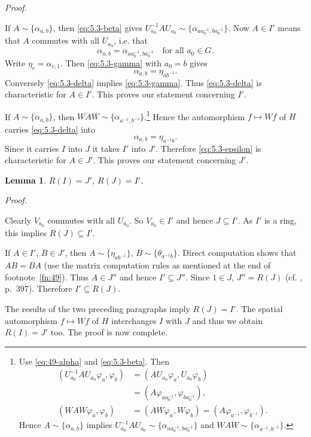 \documentclass[b5paper,twoside]{article}
\theoremstyle{mvnplain}
\newtheorem{lemma}{Lemma}[section]
\renewenvironment{proof}[1][Proof]{%
  \par\addvspace{0.35\baselineskip}%
  \noindent\textit{#1.}\ \normalfont\ignorespaces
}{%
  \par\addvspace{0.35\baselineskip}%
}
\newcommand{\R}{\mathbf R}
\newcommand{\Hilbert}{\mathfrak H}
\def\R{R}%
\def\Hilbert{H}%
\def\mathfrak#1{#1}%
\begin{document}
\begin{proof}
If \(A\sim\{\alpha_{a,b}\}\), then \eqref{eq:5.3-beta} gives
\(U_{a_0}^{-1}AU_{a_0}\sim
\{\alpha_{aa_0^{-1},ba_0^{-1}}\}\). Now \(A\in I'\) means that \(A\)
commutes with all \(U_{a_0}\), i.e. that
\begin{equation}\tag{5.3.\(\gamma\)}\label{eq:5.3-gamma}
 \alpha_{a,b}=\alpha_{aa_0^{-1},ba_0^{-1}}
 \quad\text{for all }a_0\in\mathfrak G.
\end{equation}
Write \(\eta_c=\alpha_{c,1}\). Then \eqref{eq:5.3-gamma} with \(a_0=b\)
gives
\begin{equation}\tag{5.3.\(\delta\)}\label{eq:5.3-delta}
 \alpha_{a,b}=\eta_{ab^{-1}}.
\end{equation}
Conversely \eqref{eq:5.3-delta} implies \eqref{eq:5.3-gamma}. Thus
\eqref{eq:5.3-delta} is characteristic for \(A\in I'\). This proves our
statement concerning \(I'\).

If \(A\sim\{\alpha_{a,b}\}\), then
\(WAW\sim\{\alpha_{a^{-1},b^{-1}}\}\).\footnote{\label{fn:50}Use
\eqref{eq:49-alpha} and \eqref{eq:5.3-beta}. Then
\begin{align*}
 (U_{a_0}^{-1}AU_{a_0}\varphi_a,\varphi_b)
 &=(AU_{a_0}\varphi_a,U_{a_0}\varphi_b)\\
 &=(A\varphi_{aa_0^{-1}},\varphi_{ba_0^{-1}}),\\
 (WAW\varphi_a,\varphi_b)
 &=(AW\varphi_a,W\varphi_b)
  =(A\varphi_{a^{-1}},\varphi_{b^{-1}}).
\end{align*}
Hence \(A\sim\{\alpha_{a,b}\}\) implies
\(U_{a_0}^{-1}AU_{a_0}\sim
\{\alpha_{aa_0^{-1},ba_0^{-1}}\}\) and
\(WAW\sim\{\alpha_{a^{-1},b^{-1}}\}\).} Hence the automorphism
\(f\mapsto Wf\) of \(\Hilbert\) carries \eqref{eq:5.3-delta} into
\begin{equation}\tag{5.3.\(\epsilon\)}\label{eq:5.3-epsilon}
 \alpha_{a,b}=\eta_{a^{-1}b}.
\end{equation}
Since it carries \(I\) into \(J\) it takes \(I'\) into \(J'\). Therefore
\eqref{eq:5.3-epsilon} is characteristic for \(A\in J'\). This proves our
statement concerning \(J'\).
\end{proof}

\begin{lemma}\label{lem:5.3.3}
\(\R(I)=J'\), \(\R(J)=I'\).
\end{lemma}

\begin{proof}
Clearly \(V_{a_0}\) commutes with all \(U_{a_0}\). So \(V_{a_0}\in I'\)
and hence \(J\subseteq I'\). As \(I'\) is a ring, this implies
\(\R(J)\subseteq I'\).

If \(A\in I'\), \(B\in J'\), then
\(A\sim\{\eta_{ab^{-1}}\}\), \(B\sim\{\theta_{a^{-1}b}\}\). Direct
computation shows that \(AB=BA\) (use the matrix computation rules as
mentioned at the end of footnote~\ref{fn:49}). Thus \(A\in J''\) and hence
\(I'\subseteq J''\). Since \(1\in J\), \(J''=\R(J)\) (cf.
\cite{ref2}, p.~397). Therefore \(I'\subseteq\R(J)\).

The results of the two preceding paragraphs imply \(\R(J)=I'\). The spatial
automorphism \(f\mapsto Wf\) of \(\Hilbert\) interchanges \(I\) with \(J\)
and thus we obtain \(\R(I)=J'\) too. The proof is now complete.
\end{proof}
\end{document}
